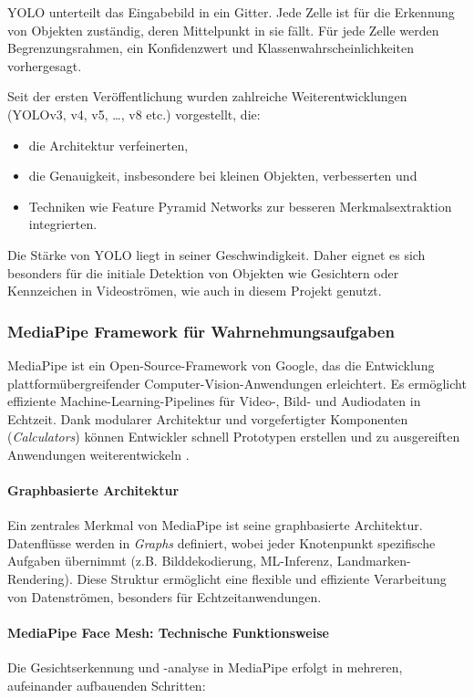 YOLO unterteilt das Eingabebild in ein Gitter. Jede Zelle ist für die Erkennung von Objekten zuständig, deren Mittelpunkt in sie fällt. Für jede Zelle werden Begrenzungsrahmen, ein Konfidenzwert und Klassenwahrscheinlichkeiten vorhergesagt. 

Seit der ersten Veröffentlichung wurden zahlreiche Weiterentwicklungen (YOLOv3, v4, v5, \ldots, v8 etc.) vorgestellt, die:
\begin{itemize}
    \item die Architektur verfeinerten,
    \item die Genauigkeit, insbesondere bei kleinen Objekten, verbesserten und
    \item Techniken wie Feature Pyramid Networks zur besseren Merkmalsextraktion integrierten.
\end{itemize}

Die Stärke von YOLO liegt in seiner Geschwindigkeit. Daher eignet es sich besonders für die initiale Detektion von Objekten wie Gesichtern oder Kennzeichen in Videoströmen, wie auch in diesem Projekt genutzt.

\subsubsection{MediaPipe Framework für Wahrnehmungsaufgaben}

MediaPipe ist ein Open-Source-Framework von Google, das die Entwicklung plattformübergreifender Computer-Vision-Anwendungen erleichtert. Es ermöglicht effiziente Machine-Learning-Pipelines für Video-, Bild- und Audiodaten in Echtzeit. Dank modularer Architektur und vorgefertigter Komponenten (\textit{Calculators}) können Entwickler schnell Prototypen erstellen und zu ausgereiften Anwendungen weiterentwickeln \cite{mediapipe_solutions_guide}.

\paragraph{Graphbasierte Architektur}
Ein zentrales Merkmal von MediaPipe ist seine graphbasierte Architektur. Datenflüsse werden in \textit{Graphs} definiert, wobei jeder Knotenpunkt spezifische Aufgaben übernimmt (z.B. Bilddekodierung, ML-Inferenz, Landmarken-Rendering). Diese Struktur ermöglicht eine flexible und effiziente Verarbeitung von Datenströmen, besonders für Echtzeitanwendungen.

\paragraph{MediaPipe Face Mesh: Technische Funktionsweise}
Die Gesichtserkennung und -analyse in MediaPipe erfolgt in mehreren, aufeinander aufbauenden Schritten:

